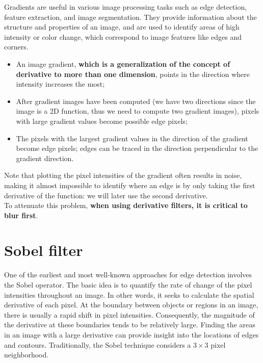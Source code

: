 \documentclass{article}
\begin{document}
Gradients are useful in various image processing tasks such as edge detection, feature extraction, and image segmentation. They provide information about the structure and properties of an image, and are used to identify areas of high intensity or color change, which correspond to image features like edges and corners.

\begin{itemize}
    \item An image gradient, \textbf{which is a generalization of the concept of derivative to more than one dimension}, points in the direction where intensity increases the most;
    \item After gradient images have been computed (we have two directions since the image is a 2D function, thus we need to compute two gradient images), pixels with large gradient values become possible edge pixels;
    \item The pixels with the largest gradient values in the direction of the gradient become edge pixels; edges can be traced in the direction perpendicular to the gradient direction.
\end{itemize}

Note that plotting the pixel intensities of the gradient often results in noise, making it almost impossible to identify where an edge is by only taking the first derivative of the function: we will later use the second derivative.\\

To attenuate this problem, \textbf{when using derivative filters, it is critical to blur first}.

\newpage

\section*{Sobel filter}


One of the earliest and most well-known approaches for edge detection involves the Sobel operator. The basic idea is to quantify the rate of change of the pixel intensities throughout an image. In other words, it seeks to calculate the spatial derivative of each pixel. At the boundary between objects or regions in an image, there is usually a rapid shift in pixel intensities. Consequently, the magnitude of the derivative at these boundaries tends to be relatively large. Finding the areas in an image with a large derivative can provide insight into the locations of edges and contours. Traditionally, the Sobel technique considers a $3\times3$ pixel neighborhood. \\
\end{document}

